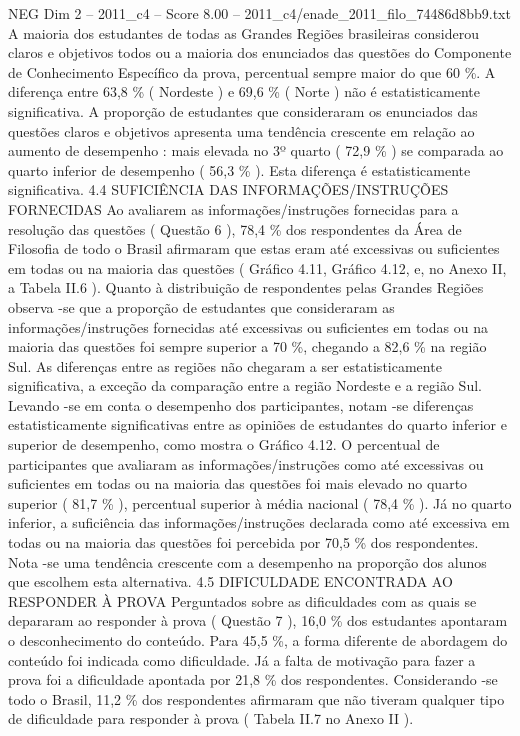 \begin{textsample}{NEG Dim 2 – 2011\_c4 – Score 8.00 – 2011\_c4/enade\_2011\_filo\_74486d8bb9.txt}
A maioria dos estudantes de todas as Grandes Regiões brasileiras considerou claros e objetivos todos ou a maioria dos enunciados das questões do Componente de Conhecimento Específico da prova, percentual sempre maior do que 60 \%.
A diferença entre 63,8 \% ( Nordeste ) e 69,6 \% ( Norte ) não é estatisticamente significativa.
A proporção de estudantes que consideraram os enunciados das questões claros e objetivos apresenta uma tendência crescente em relação ao aumento de desempenho : mais elevada no 3º quarto ( 72,9 \% ) se comparada ao quarto inferior de desempenho ( 56,3 \% ).
Esta diferença é estatisticamente significativa. 4.4 SUFICIÊNCIA DAS INFORMAÇÕES/INSTRUÇÕES FORNECIDAS Ao avaliarem as informações/instruções fornecidas para a resolução das questões ( Questão 6 ), 78,4 \% dos respondentes da Área de Filosofia de todo o Brasil afirmaram que estas eram até excessivas ou suficientes em todas ou na maioria das questões ( Gráfico 4.11, Gráfico 4.12, e, no Anexo II, a Tabela II.6 ).
Quanto à distribuição de respondentes pelas Grandes Regiões observa -se que a proporção de estudantes que consideraram as informações/instruções fornecidas até excessivas ou suficientes em todas ou na maioria das questões foi sempre superior a 70 \%, chegando a 82,6 \% na região Sul.
As diferenças entre as regiões não chegaram a ser estatisticamente significativa, a exceção da comparação entre a região Nordeste e a região Sul.
Levando -se em conta o desempenho dos participantes, notam -se diferenças estatisticamente significativas entre as opiniões de estudantes do quarto inferior e superior de desempenho, como mostra o Gráfico 4.12.
O percentual de participantes que avaliaram as informações/instruções como até excessivas ou suficientes em todas ou na maioria das questões foi mais elevado no quarto superior ( 81,7 \% ), percentual superior à média nacional ( 78,4 \% ).
Já no quarto inferior, a suficiência das informações/instruções declarada como até excessiva em todas ou na maioria das questões foi percebida por 70,5 \% dos respondentes.
Nota -se uma tendência crescente com a desempenho na proporção dos alunos que escolhem esta alternativa. 4.5 DIFICULDADE ENCONTRADA AO RESPONDER À PROVA Perguntados sobre as dificuldades com as quais se depararam ao responder à prova ( Questão 7 ), 16,0 \% dos estudantes apontaram o desconhecimento do conteúdo.
Para 45,5 \%, a forma diferente de abordagem do conteúdo foi indicada como dificuldade.
Já a falta de motivação para fazer a prova foi a dificuldade apontada por 21,8 \% dos respondentes.
Considerando -se todo o Brasil, 11,2 \% dos respondentes afirmaram que não tiveram qualquer tipo de dificuldade para responder à prova ( Tabela II.7 no Anexo II ).

\end{textsample}
